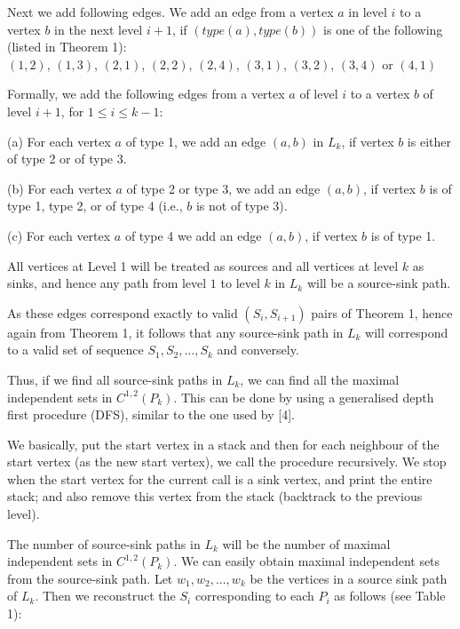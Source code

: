 \documentclass[10pt]{article}
\begin{document}
Next we add following edges. We add an edge from a vertex $a$ in level
$i$ to a vertex $b$ in the next level $i+1$, if $(type(a),type(b))$ is
one of the following (listed in Theorem 1):\\

$(1,2)$, $(1,3)$, $(2,1)$, $(2,2)$, $(2,4)$, $(3,1)$, $(3,2)$, $(3,4)$ or
$(4,1)$


Formally, we add the following edges from a vertex $a$ of level $i$ to a
vertex $b$ of level $i+1$, for $1\leq i\leq k-1$:

\noindent (a) For each vertex $a$ of type 1, we add an edge $(a,b)$ in $L_k$, if
vertex $b$ is either of type 2 or of type 3.
 
\noindent (b) For each vertex $a$ of type 2 or type 3, we add an edge $(a,b)$, if 
vertex $b$ is of type 1, type 2, or of type 4 (i.e., $b$ is not of type
3).

\noindent (c) For each vertex $a$ of type 4 we add an edge $(a,b)$, if vertex $b$
is of type 1.



All vertices at Level 1 will be treated as sources and all vertices at
level $k$ as sinks, and hence any path from level $1$ to level $k$ in
$L_k$ will be a source-sink path.

As these edges correspond exactly to valid $(S_i,S_{i+1})$ pairs of
Theorem 1, hence again from Theorem 1, it follows that any source-sink
path in $L_k$ will correspond to a valid set of sequence $S_1, S_2, ...,
S_k$ and conversely.

Thus, if we find all source-sink paths in $L_k$, we can find all the
maximal independent sets in $C^{1,2} (P_k)$. This can be done by using a
generalised depth first procedure (DFS), similar to the one used by [4]. 


We basically, put the start vertex in a stack and then for each neighbour
of the start vertex (as the new start vertex), we call the procedure
recursively. We stop when the start vertex for the current call is a sink
vertex, and print the entire stack; and also remove this vertex from the
stack (backtrack to the previous level). 

The number of source-sink paths in $L_k$ will be the number of maximal
independent sets in $C^{1,2}(P_k)$.  We can easily obtain maximal
independent sets from the source-sink path.  Let $w_1,w_2, ..., w_k$ be
the vertices in a source sink path of $L_k$. Then we reconstruct the
$S_i$ corresponding to each $P_i$ as follows (see Table 1):\\
\end{document}

